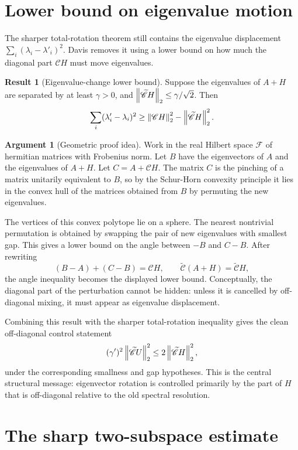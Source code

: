 \documentclass[11pt]{article}
\newcommand{\Fsp}{\mathscr{F}}
\newcommand{\Pinch}{\mathscr{C}}
\newcommand{\Off}{\widetilde{\mathscr{C}}}
\newcommand{\Fsp}{\mathcal{F}}
\newcommand{\Pinch}{\mathcal{D}}
\newcommand{\Off}{\mathcal{D}^{\perp}}
\newcommand{\lam}{\lambda}
\newcommand{\hlam}{\lambda'}
\theoremstyle{definition}
\newtheorem{result}[definition]{Result}
\newtheorem{argument}[definition]{Argument}
\begin{document}
\section{Lower bound on eigenvalue motion}

The sharper total-rotation theorem still contains the eigenvalue displacement
\(\sum_i(\lam_i-\hlam_i)^2\).  Davis removes it using a lower bound on how much
the diagonal part \(\Pinch H\) must move eigenvalues.

\begin{result}[Eigenvalue-change lower bound]
Suppose the eigenvalues of \(A+H\) are separated by at least \(\gamma>0\), and
\(\norm[2]{\Off H}\le \gamma/\sqrt2\).  Then
\[
  \sum_i(\hlam_i-\lam_i)^2
  \ge
  \norm[2]{\Pinch H}^2-\norm[2]{\Off H}^2.
\]
\end{result}

\begin{argument}[Geometric proof idea]
Work in the real Hilbert space \(\Fsp\) of hermitian matrices with Frobenius
norm.  Let \(B\) have the eigenvectors of \(A\) and the eigenvalues of
\(A+H\).  Let \(C=A+\Pinch H\).  The matrix \(C\) is the pinching of a matrix
unitarily equivalent to \(B\), so by the Schur-Horn convexity principle it lies
in the convex hull of the matrices obtained from \(B\) by permuting the new
eigenvalues.

The vertices of this convex polytope lie on a sphere.  The nearest nontrivial
permutation is obtained by swapping the pair of new eigenvalues with smallest
gap.  This gives a lower bound on the angle between \(-B\) and \(C-B\).  After
rewriting
\[
  (B-A)+(C-B)=\Pinch H,
  \qquad
  \Off(A+H)=\Off H,
\]
the angle inequality becomes the displayed lower bound.  Conceptually, the
diagonal part of the perturbation cannot be hidden: unless it is cancelled by
off-diagonal mixing, it must appear as eigenvalue displacement.
\end{argument}

Combining this result with the sharper total-rotation inequality gives the
clean off-diagonal control statement
\[
  (\gamma')^2\norm[2]{\Off U}^2 \le 2\norm[2]{\Off H}^2,
\]
under the corresponding smallness and gap hypotheses.  This is the central
structural message: eigenvector rotation is controlled primarily by the
part of \(H\) that is off-diagonal relative to the old spectral resolution.

\section{The sharp two-subspace estimate}
\end{document}

